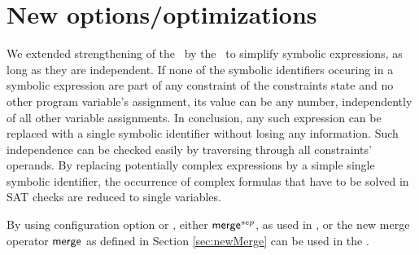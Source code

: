 \section{New options/optimizations}
\label{sec:newOptions}

We extended strengthening of the \ by the \constraintsCPA\ to simplify symbolic expressions, as long as they are independent.
If none of the symbolic identifiers occuring in a symbolic expression are part of any constraint of the constraints state and no other program variable's assignment,
its value can be any number, independently of all other variable assignments.
In conclusion, any such expression can be replaced with a single symbolic identifier without losing any information.
Such independence can be checked easily by traversing through all constraints' operands.
By replacing potentially complex expressions by a simple single symbolic identifier, the occurrence of complex formulas that have to be solved in SAT checks are reduced to single variables.
 
By using configuration option  or , either $\operatorname{\operatorname{\mathsf{merge}}}^{sep}$, as used in \cite{Lemberger2015}, or the new merge operator $\operatorname{\operatorname{\mathsf{merge}}}$ as defined in Section \ref{sec:newMerge} can be used in the \constraintsCPA.

